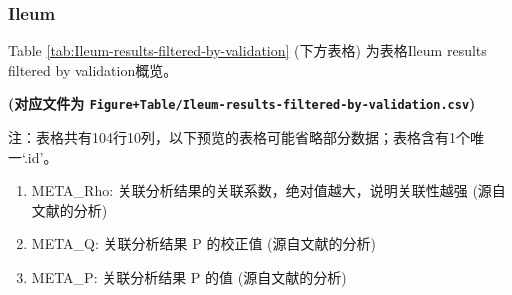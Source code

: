 \documentclass[
]{article}
\providecommand{\tightlist}{%
  \setlength{\itemsep}{0pt}\setlength{\parskip}{0pt}}
\begin{document}
\hypertarget{ileum-1}{%
\subsubsection{Ileum}\label{ileum-1}}

Table \ref{tab:Ileum-results-filtered-by-validation} (下方表格) 为表格Ileum results filtered by validation概览。

\textbf{(对应文件为 \texttt{Figure+Table/Ileum-results-filtered-by-validation.csv})}

\begin{center}\begin{tcolorbox}[colback=gray!10, colframe=gray!50, width=0.9\linewidth, arc=1mm, boxrule=0.5pt]注：表格共有104行10列，以下预览的表格可能省略部分数据；表格含有1个唯一`.id'。
\end{tcolorbox}
\end{center}
\begin{center}\begin{tcolorbox}[colback=gray!10, colframe=gray!50, width=0.9\linewidth, arc=1mm, boxrule=0.5pt]\begin{enumerate}\tightlist
\item META\_Rho:  关联分析结果的关联系数，绝对值越大，说明关联性越强 (源自文献的分析)
\item META\_Q:  关联分析结果 P 的校正值 (源自文献的分析)
\item META\_P:  关联分析结果 P 的值 (源自文献的分析)
\end{enumerate}\end{tcolorbox}
\end{center}
\end{document}
